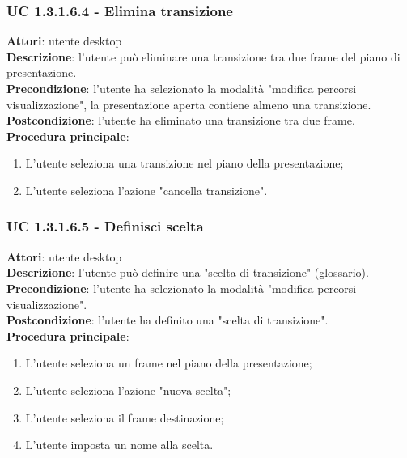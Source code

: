\subsubsection{UC 1.3.1.6.4 - Elimina transizione}{
	\label{uc1.3.1.6.4}
	\textbf{Attori}: utente desktop \\
	\textbf{Descrizione}: l'utente può eliminare una transizione tra due frame del piano di presentazione. \\
	\textbf{Precondizione}: l'utente ha selezionato la modalità "modifica percorsi visualizzazione", la presentazione aperta contiene almeno una transizione.	\\
	\textbf{Postcondizione}: l'utente ha eliminato una transizione tra due frame.	\\
	\textbf{Procedura principale}:
	\begin{enumerate}
		\item L'utente seleziona una transizione nel piano della presentazione;
		\item L'utente seleziona l'azione "cancella transizione".
	\end{enumerate}
}
\subsubsection{UC 1.3.1.6.5 - Definisci scelta}{
	\label{uc1.3.1.6.5}
	\textbf{Attori}: utente desktop \\
	\textbf{Descrizione}: l'utente può definire una "scelta di transizione" (glossario). \\
	\textbf{Precondizione}: l'utente ha selezionato la modalità "modifica percorsi visualizzazione".	\\
	\textbf{Postcondizione}: l'utente ha definito una "scelta di transizione".	\\
	\textbf{Procedura principale}:
	\begin{enumerate}
		\item L'utente seleziona un frame nel piano della presentazione;
		\item L'utente seleziona l'azione "nuova scelta";
		\item L'utente seleziona il frame destinazione;
		\item L'utente imposta un nome alla scelta.
	\end{enumerate}
}
